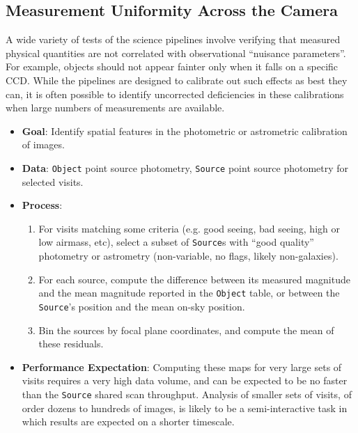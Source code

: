 \documentclass[DM,authoryear,toc]{lsstdoc}
\begin{document}
\subsection{Measurement Uniformity Across the Camera}

A wide variety of tests of the science pipelines involve verifying that measured
physical quantities are not correlated with observational ``nuisance
parameters''. For example, objects should not appear fainter only when it falls
on a specific CCD. While the pipelines are designed to calibrate out such
effects as best they can, it is often possible to identify uncorrected
deficiencies in these calibrations when large numbers of measurements are
available.

\begin{itemize}
  \item \textbf{Goal}: Identify spatial features in the photometric or
  astrometric calibration of images.
  \item \textbf{Data}: \texttt{Object} point source photometry, \texttt{Source}
  point source photometry for selected visits.
  \item \textbf{Process}:
  \begin{enumerate}
    \item For visits matching some criteria (e.g. good seeing, bad seeing, high
    or low airmass, etc), select a subset of \texttt{Source}s with ``good quality''
    photometry or astrometry (non-variable, no flags, likely non-galaxies).
    \item For each source, compute the difference between its measured magnitude
    and the mean magnitude reported in the \texttt{Object} table, or between the
    \texttt{Source}'s position and the mean on-sky position.
    \item Bin the sources by focal plane coordinates, and compute the mean of
    these residuals.
  \end{enumerate}
  \item \textbf{Performance Expectation}: Computing these maps for very large
  sets of visits requires a very high data volume, and can be expected to be no
  faster than the \texttt{Source} shared scan throughput. Analysis of smaller
  sets of visits, of order dozens to hundreds of images, is likely to be a
  semi-interactive task in which results are expected on a shorter timescale.
\end{itemize}


\end{document}

